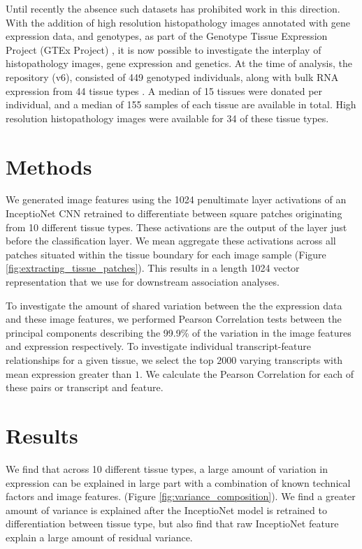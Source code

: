 \documentclass{article}
\begin{document}
Until recently the absence such datasets has prohibited work in this direction. With the addition of high resolution histopathology images annotated with gene expression data, and genotypes, as part of the Genotype Tissue Expression Project (GTEx Project) \cite{GTEx-project}, it is now possible to investigate the interplay of histopathology images, gene expression and genetics. At the time of analysis, the repository (v6), consisted of 449 genotyped individuals, along with bulk RNA expression from 44 tissue types \cite{GTEx-histology}. A median of 15 tissues were donated per individual, and a median of 155 samples of each tissue are available in total. High resolution histopathology images were available for 34 of these tissue types.

\section{Methods}

We generated image features using the 1024 penultimate layer activations of an InceptioNet CNN retrained to differentiate between square patches originating from 10 different tissue types. These activations are the output of the layer just before the classification layer. We mean aggregate these activations across all patches situated within the tissue boundary for each image sample (Figure \ref{fig:extracting_tissue_patches}). This results in a length 1024 vector representation that we use for downstream association analyses.

To investigate the amount of shared variation between the the expression data and these image features, we performed Pearson Correlation tests between the principal components describing the 99.9\% of the variation in the image features and expression respectively. To investigate individual transcript-feature relationships for a given tissue, we select the top $2000$ varying transcripts with mean expression greater than $1$. We calculate the Pearson Correlation for each of these pairs or transcript and feature.

\section{Results}
We find that across 10 different tissue types, a large amount of variation in expression can be explained in large part with a combination of known technical factors and image features. (Figure \ref{fig:variance_composition}). We find a greater amount of variance is explained after the InceptioNet model is retrained to differentiation between tissue type, but also find that raw InceptioNet feature explain a large amount of residual variance.
\end{document}
